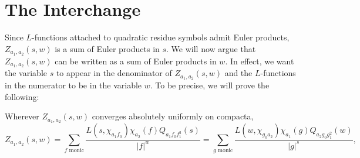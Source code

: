 \documentclass[12pt,reqno,oneside]{amsart}
\begin{document}
\section{The Interchange}
    Since $L$-functions attached to quadratic residue symbols admit Euler products, $Z_{a_{1},a_{2}}(s,w)$ is a sum of Euler products in $s$. We will now argue that $Z_{a_{1},a_{2}}(s,w)$ can be written as a sum of Euler products in $w$. In effect, we want the variable $s$ to appear in the denominator of $Z_{a_{1},a_{2}}(s,w)$ and the $L$-functions in the numerator to be in the variable $w$. To be precise, we will prove the following:

    \begin{theorem}
        Wherever $Z_{a_{1},a_{2}}(s,w)$ converges absolutely uniformly on compacta,
        \[
            Z_{a_{1},a_{2}}(s,w) = \sum_{\text{$f$ monic}}\frac{L(s,\chi_{a_{1}f_{0}})\chi_{a_{2}}(f)Q_{a_{1}f_{0}f_{1}^{2}}(s)}{|f|^{w}} = \sum_{\text{$g$ monic}}\frac{L(w,\chi_{g_{0}a_{2}})\chi_{a_{1}}(g)Q_{a_{2}g_{0}g_{1}^{2}}(w)}{|g|^{s}},
        \]
    \end{theorem}
\end{document}
